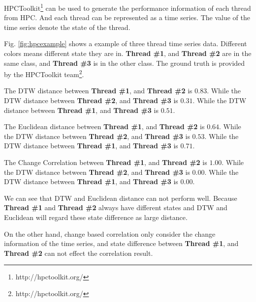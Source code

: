 HPCToolkit\footnote{http://hpctoolkit.org/} can be used to generate the performance information of each thread from HPC. 
And each thread can be represented as a time series. The value of the time series denote the state of the thread.


Fig. \ref{fig:hpcexample} shows a example of three thread time series data. Different colors means different state they are in. 
\textbf{Thread \#1}, and \textbf{Thread \#2} are in the same class, and \textbf{Thread \#3} is in the other class. The ground truth is provided by the HPCToolkit team\footnote{http://hpctoolkit.org/}.

The DTW distance between \textbf{Thread \#1}, and \textbf{Thread \#2} is $0.83$. While the DTW distance between \textbf{Thread \#2}, and \textbf{Thread \#3} is $0.31$. While the DTW distance between \textbf{Thread \#1}, and \textbf{Thread \#3} is $0.51$. 

The Euclidean distance between \textbf{Thread \#1}, and \textbf{Thread \#2} is $0.64$. While the DTW distance between \textbf{Thread \#2}, and \textbf{Thread \#3} is $0.53$. While the DTW distance between \textbf{Thread \#1}, and \textbf{Thread \#3} is $0.71$. 

The Change Correlation between \textbf{Thread \#1}, and \textbf{Thread \#2} is $1.00$. While the DTW distance between \textbf{Thread \#2}, and \textbf{Thread \#3} is $0.00$. 
While the DTW distance between \textbf{Thread \#1}, and \textbf{Thread \#3} is $0.00$. 

We can see that DTW and Euclidean distance can not perform well. Because \textbf{Thread \#1} and \textbf{Thread \#2} always have different states and DTW and Euclidean will regard these state difference as large distance.

On the other hand, change based correlation only consider the change information of the time series, and state difference between \textbf{Thread \#1}, and \textbf{Thread \#2} can not effect the correlation result.


